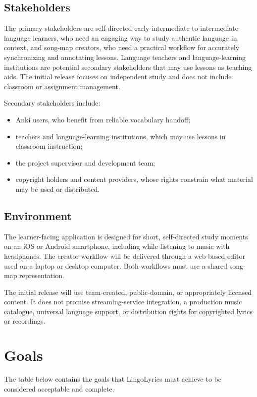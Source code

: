 \documentclass{article}
\begin{document}
\subsection{Stakeholders}
The primary stakeholders are self-directed early-intermediate to intermediate
language learners, who need an engaging way to study authentic language in
context, and song-map creators, who need a practical workflow for accurately
synchronizing and annotating lessons. Language teachers and language-learning
institutions are potential secondary stakeholders that may use lessons as
teaching aids. The initial release focuses on independent study and does not
include classroom or assignment management.

Secondary stakeholders include:
\begin{itemize}
  \item Anki users, who benefit from reliable vocabulary handoff;
  \item teachers and language-learning institutions, which may use lessons in
        classroom instruction;
  \item the project supervisor and development team;
  \item copyright holders and content providers, whose rights constrain what
        material may be used or distributed.
\end{itemize}

\subsection{Environment}
The learner-facing application is designed for short, self-directed study
moments on an iOS or Android smartphone, including while listening to music
with headphones. The creator workflow will be delivered through a web-based
editor used on a laptop or desktop computer. Both workflows must use a shared
song-map representation.

The initial release will use team-created, public-domain, or appropriately
licensed content. It does not promise streaming-service integration, a
production music catalogue, universal language support, or distribution rights
for copyrighted lyrics or recordings.

\section{Goals}
The table below contains the goals that LingoLyrics must achieve to be
considered acceptable and complete.
\end{document}
